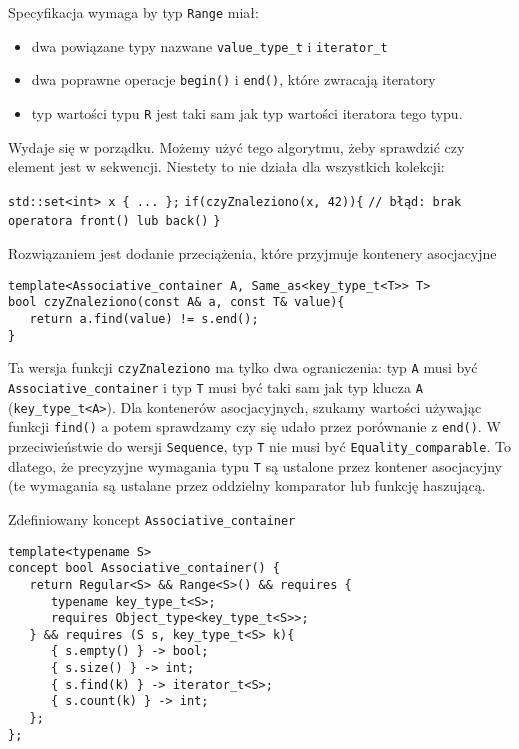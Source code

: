\documentclass[11pt, a4paper]{article}
\begin{document}
Specyfikacja wymaga by typ \verb#Range# miał:

\begin{itemize}

\item dwa powiązane typy nazwane \verb#value_type_t# i \verb#iterator_t#
\item dwa poprawne operacje \verb#begin()# i \verb#end()#, które zwracają iteratory
\item typ wartości typu \verb#R# jest taki sam jak typ wartości iteratora tego typu.

\end{itemize}

Wydaje się w porządku. Możemy użyć tego algorytmu, żeby sprawdzić czy element jest w sekwencji. Niestety to nie działa dla wszystkich kolekcji:\newline

\noindent \verb#std::set<int> x { ... };#\newline
\verb#if(czyZnaleziono(x, 42)){#\newline
\verb#// błąd: brak operatora front() lub back()#\newline
\verb#}#\newline

Rozwiązaniem jest dodanie przeciążenia, które przyjmuje kontenery asocjacyjne

\begin{lstlisting}[frame=single]
template<Associative_container A, Same_as<key_type_t<T>> T>
bool czyZnaleziono(const A& a, const T& value){
   return a.find(value) != s.end();
}
\end{lstlisting}

Ta wersja funkcji \verb#czyZnaleziono# ma tylko dwa ograniczenia: typ \verb#A# musi być \verb#Associative_container# i typ \verb#T# musi być taki sam jak typ klucza \verb#A# (\verb#key_type_t<A>#). Dla kontenerów asocjacyjnych, szukamy wartości używając funkcji \verb#find()# a potem sprawdzamy czy się udało przez porównanie z \verb#end()#. W przeciwieństwie do wersji \verb#Sequence#, typ \verb#T# nie musi być \verb#Equality_comparable#. To dlatego, że precyzyjne wymagania typu \verb#T# są ustalone przez kontener asocjacyjny (te wymagania są ustalane przez oddzielny komparator lub funkcję haszującą.

Zdefiniowany koncept \verb#Associative_container#
\begin{lstlisting}[frame=single]
template<typename S>
concept bool Associative_container() {
   return Regular<S> && Range<S>() && requires {
      typename key_type_t<S>;
      requires Object_type<key_type_t<S>>;
   } && requires (S s, key_type_t<S> k){
      { s.empty() } -> bool;
      { s.size() } -> int;
      { s.find(k) } -> iterator_t<S>;
      { s.count(k) } -> int;
   };
};
\end{lstlisting}
\end{document}
